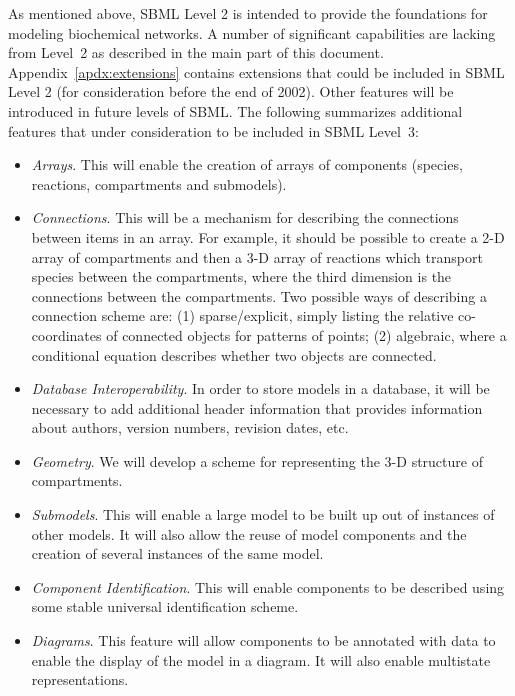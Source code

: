 \documentclass[10pt,twocolumntoc]{cekarticle}
\begin{document}
As mentioned above, SBML Level 2 is intended to provide the foundations for modeling biochemical networks.  A number of
significant capabilities are lacking from Level~2 as described in the main part of this document.  Appendix~\ref{apdx:extensions} contains extensions that could be included in SBML Level 2 (for consideration before the end of 2002). Other features will be
introduced in future levels of SBML.  The following
summarizes additional features that under consideration to be
included in SBML Level~3:
\begin{itemize}

\item \emph{Arrays}.  This will enable the creation of arrays of components
  (species, reactions, compartments and submodels).

\item \emph{Connections}.  This will be a mechanism for describing the
  connections between items in an array.  For example, it should be
  possible to create a 2-D array of compartments and then a 3-D array of
  reactions which transport species between the compartments, where the
  third dimension is the connections between the compartments.  Two
  possible ways of describing a connection scheme are: (1) sparse/explicit,
  simply listing the relative co-coordinates of connected objects for
  patterns of points; (2) algebraic, where a conditional equation describes
  whether two objects are connected.

\item \emph{Database Interoperability}.  In order to store models in a
  database, it will be necessary to add additional header information that
  provides information about authors, version numbers, revision dates, etc.

\item \emph{Geometry}.  We will develop a scheme for representing the 3-D
  structure of compartments.

\item \emph{Submodels}.  This will enable a large model to be built up out
  of instances of other models.  It will also allow the reuse of model
  components and the creation of several instances of the same model.

\item \emph{Component Identification}.  This will enable components to be
  described using some stable universal identification scheme.

\item \emph{Diagrams}.  This feature will allow components to be
annotated
  with data to enable the display of the model in a diagram.  It will also
  enable multistate representations.


\end{itemize}
\end{document}
